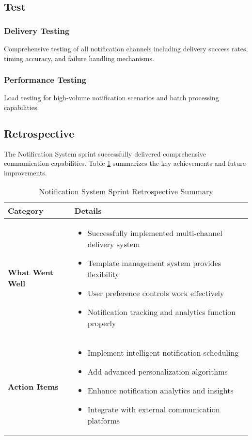 \subsection{Test}
\subsubsection{Delivery Testing}
Comprehensive testing of all notification channels including delivery success rates, timing accuracy, and failure handling mechanisms.

\subsubsection{Performance Testing}
Load testing for high-volume notification scenarios and batch processing capabilities.

\subsection{Retrospective}

The Notification System sprint successfully delivered comprehensive communication capabilities. Table \ref{tab:notification-system-retrospective} summarizes the key achievements and future improvements.

\begin{table}[htbp]
    \centering
    \begin{tabular}{|p{3cm}|p{10cm}|}
        \hline
        \textbf{Category} & \textbf{Details} \\
        \hline
        \textbf{What Went Well} & 
        \begin{itemize}
            \item Successfully implemented multi-channel delivery system
            \item Template management system provides flexibility
            \item User preference controls work effectively
            \item Notification tracking and analytics function properly
        \end{itemize} \\
        \hline
        \textbf{Action Items} & 
        \begin{itemize}
            \item Implement intelligent notification scheduling
            \item Add advanced personalization algorithms
            \item Enhance notification analytics and insights
            \item Integrate with external communication platforms
        \end{itemize} \\
        \hline
    \end{tabular}
    \caption{Notification System Sprint Retrospective Summary}
    \label{tab:notification-system-retrospective}
\end{table} 
